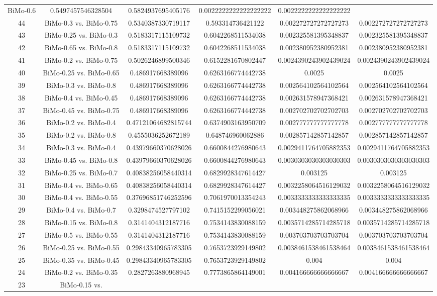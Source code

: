 \documentclass[a4paper,10pt]{article}
\begin{document}
\begin{landscape}
\begin{table}[!htp]
\begin{tabular}{cccccc}
BiMo-0.6&0.5497457546328504&0.5824937695405176&0.0022222222222222222&0.0022222222222222222\\44&BiMo-0.3 vs. BiMo-0.75&0.5340387330719117&0.593314736421122&0.002272727272727273&0.002272727272727273\\43&BiMo-0.25 vs. BiMo-0.3&0.5183317115109732&0.6042268511534038&0.002325581395348837&0.002325581395348837\\42&BiMo-0.65 vs. BiMo-0.8&0.5183317115109732&0.6042268511534038&0.002380952380952381&0.002380952380952381\\41&BiMo-0.2 vs. BiMo-0.75&0.5026246899500346&0.6152281670802447&0.0024390243902439024&0.0024390243902439024\\40&BiMo-0.25 vs. BiMo-0.65&0.486917668389096&0.6263166774442738&0.0025&0.0025\\39&BiMo-0.3 vs. BiMo-0.8&0.486917668389096&0.6263166774442738&0.002564102564102564&0.002564102564102564\\38&BiMo-0.4 vs. BiMo-0.45&0.486917668389096&0.6263166774442738&0.002631578947368421&0.002631578947368421\\37&BiMo-0.45 vs. BiMo-0.75&0.486917668389096&0.6263166774442738&0.002702702702702703&0.002702702702702703\\36&BiMo-0.2 vs. BiMo-0.4&0.47121064682815744&0.6374903163950709&0.002777777777777778&0.002777777777777778\\35&BiMo-0.2 vs. BiMo-0.8&0.4555036252672189&0.648746960062886&0.002857142857142857&0.002857142857142857\\34&BiMo-0.3 vs. BiMo-0.4&0.43979660370628026&0.6600844276980643&0.0029411764705882353&0.0029411764705882353\\33&BiMo-0.45 vs. BiMo-0.8&0.43979660370628026&0.6600844276980643&0.0030303030303030303&0.0030303030303030303\\32&BiMo-0.25 vs. BiMo-0.7&0.40838256058440314&0.6829928347614427&0.003125&0.003125\\31&BiMo-0.4 vs. BiMo-0.65&0.40838256058440314&0.6829928347614427&0.0032258064516129032&0.0032258064516129032\\30&BiMo-0.4 vs. BiMo-0.55&0.37696851746252596&0.7061970013354243&0.0033333333333333335&0.0033333333333333335\\29&BiMo-0.4 vs. BiMo-0.7&0.3298474527797102&0.7415152299056021&0.003448275862068966&0.003448275862068966\\28&BiMo-0.15 vs. BiMo-0.8&0.3141404312187716&0.7534143830088159&0.0035714285714285718&0.0035714285714285718\\27&BiMo-0.5 vs. BiMo-0.55&0.3141404312187716&0.7534143830088159&0.003703703703703704&0.003703703703703704\\26&BiMo-0.25 vs. BiMo-0.55&0.29843340965783305&0.7653723929149802&0.0038461538461538464&0.0038461538461538464\\25&BiMo-0.35 vs. BiMo-0.45&0.29843340965783305&0.7653723929149802&0.004&0.004\\24&BiMo-0.2 vs. BiMo-0.35&0.2827263880968945&0.7773865864149001&0.004166666666666667&0.004166666666666667\\23&BiMo-0.15 vs. 
\end{tabular}
\end{table}
\end{landscape}
\end{document}
